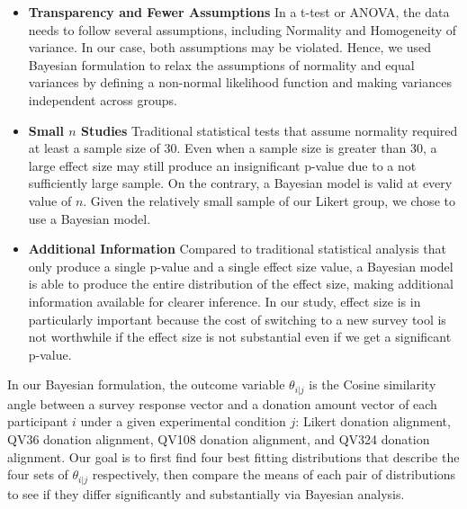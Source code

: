 \begin{itemize}
    \item \textbf{Transparency and Fewer Assumptions} 
    In a t-test or ANOVA, 
    the data needs to follow several assumptions, 
    including Normality and Homogeneity of variance. 
    In our case, both assumptions may be violated. 
    Hence, we used Bayesian formulation 
    to relax the assumptions of normality and 
    equal variances by defining 
    a non-normal likelihood function 
    and making variances independent across groups.
    \item \textbf{Small $n$ Studies} 
    Traditional statistical tests 
    that assume normality 
    required at least a sample size of 30. 
    Even when a sample size is greater than 30, 
    a large effect size may still produce 
    an insignificant p-value 
    due to a not sufficiently large sample. 
    On the contrary, 
    a Bayesian model is valid at every value of $n$. 
    Given the relatively small sample 
    of our Likert group, 
    we chose to use a Bayesian model.
    \item \textbf{Additional Information} 
    Compared to traditional statistical analysis 
    that only produce a single p-value 
    and a single effect size value, 
    a Bayesian model is able to produce 
    the entire distribution of the effect size, 
    making additional information available 
    for clearer inference. 
    In our study, 
    effect size is in particularly important 
    because the cost of switching to a new survey tool 
    is not worthwhile 
    if the effect size is not substantial 
    even if we get a significant p-value.
\end{itemize}

In our Bayesian formulation, 
the outcome variable $\theta_{i|j}$ 
is the Cosine similarity angle 
between a survey response vector and 
a donation amount vector of each participant $i$ 
under a given experimental condition $j$: 
Likert donation alignment, QV36 donation alignment, 
QV108 donation alignment, and QV324 donation alignment. 
Our goal is to first find four best fitting distributions
that describe the four sets of $\theta_{i|j}$ respectively, 
then compare the means of each pair of distributions 
to see if they differ significantly 
and substantially via Bayesian analysis.

